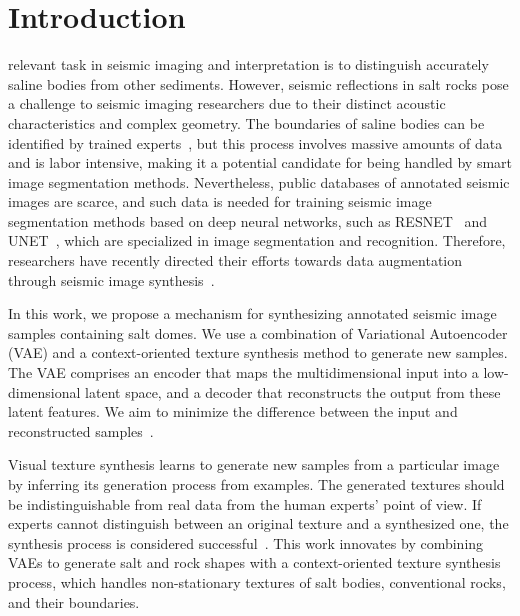 \documentclass{ieeeaccess}
\begin{document}
\titlepgskip=-21pt

\maketitle

\section{Introduction}
\label{sec:introduction}
 relevant task in seismic imaging and interpretation is to distinguish accurately saline bodies from other sediments. However, seismic reflections in salt rocks pose a challenge to seismic imaging researchers due to their distinct acoustic characteristics and complex geometry. The boundaries of saline bodies can be identified by trained experts~\cite{Zeng2019}, but this process involves massive amounts of data and is labor intensive, making it a potential candidate for being handled by smart image segmentation methods. Nevertheless, public databases of annotated seismic images are scarce, and such data is needed for training seismic image segmentation methods based on deep neural networks, such as RESNET~\cite{He2016} and UNET~\cite{Ronneberger2015}, which are specialized in image segmentation and recognition. Therefore, researchers have recently directed their efforts towards data augmentation through seismic image synthesis~\cite{Henriques2021}.

In this work, we propose a mechanism for synthesizing annotated seismic image samples containing salt domes. We use a combination of Variational Autoencoder (VAE) and a context-oriented texture synthesis method to generate new samples. The VAE comprises an encoder that maps the multidimensional input into a low-dimensional latent space, and a decoder that reconstructs the output from these latent features. We aim to minimize the difference between the input and reconstructed samples~\cite{Li2020}.

Visual texture synthesis learns to generate new samples from a particular image by inferring its generation process from examples. The generated textures should be indistinguishable from real data from the human experts' point of view. If experts cannot distinguish between an original texture and a synthesized one, the synthesis process is considered successful~\cite{Gatys2015}. This work innovates by combining VAEs to generate salt and rock shapes with a context-oriented texture synthesis process, which handles non-stationary textures of salt bodies, conventional rocks, and their boundaries. 
\end{document}
